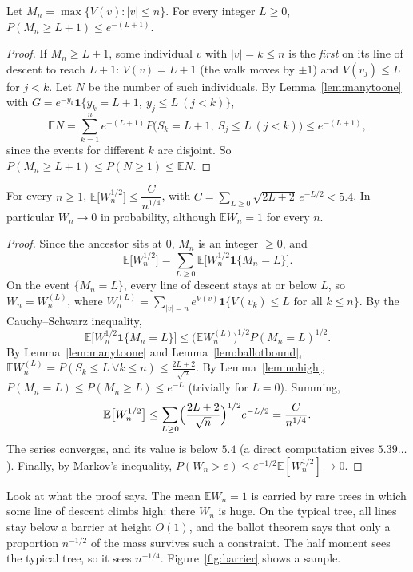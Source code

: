 \begin{lemma}\label{lem:nohigh}
Let $M_n=\max\{V(v):|v|\le n\}$. For every integer $L\ge0$, $P(M_n\ge L+1)\le e^{-(L+1)}$.
\end{lemma}

\begin{proof}
If $M_n\ge L+1$, some individual $v$ with $|v|=k\le n$ is the \emph{first} on its line of descent to reach $L+1$: $V(v)=L+1$ (the walk moves by $\pm1$) and $V(v_j)\le L$ for $j<k$. Let $N$ be the number of such individuals. By Lemma~\ref{lem:manytoone} with $G=e^{-y_k}\mathbf 1\{y_k=L+1,\ y_j\le L\ (j<k)\}$,
\[
\mathbb EN=\sum_{k=1}^n e^{-(L+1)}P\bigl(S_k=L+1,\ S_j\le L\ (j<k)\bigr)\le e^{-(L+1)},
\]
since the events for different $k$ are disjoint. So $P(M_n\ge L+1)\le P(N\ge1)\le\mathbb EN$.
\end{proof}

\begin{theorem}\label{thm:halfmoment}
For every $n\ge1$, $\mathbb E\bigl[W_n^{1/2}\bigr]\le\dfrac{C}{n^{1/4}}$, with $C=\sum_{L\ge0}\sqrt{2L+2}\,e^{-L/2}<5.4$. In particular $W_n\to0$ in probability, although $\mathbb EW_n=1$ for every $n$.
\end{theorem}

\begin{proof}
Since the ancestor sits at $0$, $M_n$ is an integer $\ge0$, and
\[
\mathbb E\bigl[W_n^{1/2}\bigr]=\sum_{L\ge0}\mathbb E\bigl[W_n^{1/2}\mathbf 1\{M_n=L\}\bigr].
\]
On the event $\{M_n=L\}$, every line of descent stays at or below $L$, so $W_n=W_n^{(L)}$, where $W_n^{(L)}=\sum_{|v|=n}e^{V(v)}\mathbf 1\{V(v_k)\le L\text{ for all }k\le n\}$. By the Cauchy--Schwarz inequality,
\[
\mathbb E\bigl[W_n^{1/2}\mathbf 1\{M_n=L\}\bigr]\le\bigl(\mathbb EW_n^{(L)}\bigr)^{1/2}P(M_n=L)^{1/2}.
\]
By Lemma~\ref{lem:manytoone} and Lemma~\ref{lem:ballotbound}, $\mathbb EW_n^{(L)}=P(S_k\le L\ \forall k\le n)\le\frac{2L+2}{\sqrt n}$. By Lemma~\ref{lem:nohigh}, $P(M_n=L)\le P(M_n\ge L)\le e^{-L}$ (trivially for $L=0$). Summing,
\[
\mathbb E\bigl[W_n^{1/2}\bigr]\le\sum_{L\ge0}\Bigl(\frac{2L+2}{\sqrt n}\Bigr)^{1/2}e^{-L/2}=\frac C{n^{1/4}}.
\]
The series converges, and its value is below $5.4$ (a direct computation gives $5.39\ldots$). Finally, by Markov's inequality, $P(W_n>\varepsilon)\le\varepsilon^{-1/2}\mathbb E[W_n^{1/2}]\to0$.
\end{proof}

Look at what the proof says. The mean $\mathbb EW_n=1$ is carried by rare trees in which some line of descent climbs high: there $W_n$ is huge. On the typical tree, all lines stay below a barrier at height $O(1)$, and the ballot theorem says that only a proportion $n^{-1/2}$ of the mass survives such a constraint. The half moment sees the typical tree, so it sees $n^{-1/4}$. Figure~\ref{fig:barrier} shows a sample.

